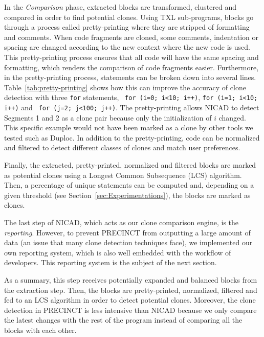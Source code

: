 In the \textit{Comparison} phase, extracted blocks are transformed, clustered and compared in order to find potential clones.
Using TXL sub-programs, blocks go through a process called pretty-printing where they are stripped of formatting and comments.
When code fragments are cloned, some comments, indentation or spacing are changed according to the new context where the new code is used. This pretty-printing process ensures that all code will have the same spacing and formatting, which renders the comparison of code fragments easier.
Furthermore, in the pretty-printing process, statements can be broken down into several lines.
Table~\ref{tab:pretty-printing} shows how this can improve the accuracy of clone detection with three \texttt{for} statements, \texttt{ for (i=0; i<10; i++)}, \texttt{for (i=1; i<10; i++)} and \texttt{ for (j=2; j<100; j++)}.
The pretty-printing allows NICAD to detect Segments 1 and 2 as a clone pair because only the initialization of $i$ changed.
This specific example would not have been marked as a clone by other  tools we tested such as Duploc\cite{Ducasse1999}.
In addition to the pretty-printing, code can be normalized and filtered to detect different classes of clones and match user preferences.



Finally, the extracted, pretty-printed, normalized and filtered blocks are marked as potential clones using a Longest Common Subsequence (LCS) algorithm\cite{Hunt1977}. Then, a percentage of unique statements can be computed and, depending on a given threshold (see Section~\ref{sec:Experimentations}), the blocks are marked as clones.

The last step of NICAD, which acts as our clone comparison engine, is the \textit{reporting}. However, to prevent PRECINCT from outputting a large amount of data (an issue that many clone detection techniques face), we  implemented our own reporting system, which is also well embedded with the workflow of developers. This reporting system is the subject of the next section.

As a summary, this step receives potentially expanded and balanced blocks from the extraction step.
Then, the blocks are pretty-printed, normalized, filtered and fed to an LCS algorithm in order to detect potential clones.
Moreover, the clone detection in PRECINCT is less intensive than NICAD because we only compare the latest changes with the rest of the program instead of comparing all the blocks with each other.

